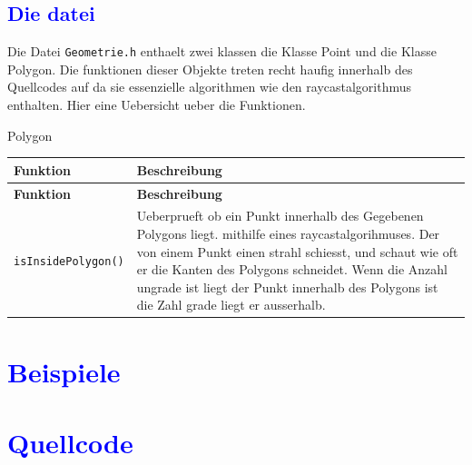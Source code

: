 \documentclass{article}
\begin{document}
\subsection{\textcolor{blue}{Die datei }}
Die Datei \texttt{Geometrie.h} enthaelt zwei klassen die Klasse Point und die Klasse Polygon. Die funktionen dieser Objekte treten recht haufig innerhalb des Quellcodes auf da sie essenzielle algorithmen wie den raycastalgorithmus enthalten. Hier eine Uebersicht ueber die Funktionen.
\par\medskip
\begin{center}\Large{ Polygon}\end{center}
\begin{longtable}{|>{\raggedright\arraybackslash}p{3.5cm}|p{11.5cm}|}
\hline
\textbf{Funktion} & \textbf{Beschreibung} \\
\hline
\endfirsthead
\hline
\textbf{Funktion} & \textbf{Beschreibung} \\
\hline
\endhead
\texttt{isInsidePolygon()} &
Ueberprueft ob ein Punkt innerhalb des Gegebenen Polygons liegt. mithilfe eines raycastalgorihmuses. Der von einem Punkt einen strahl schiesst, und schaut wie oft er die Kanten des Polygons schneidet. Wenn die Anzahl ungrade ist liegt der Punkt innerhalb des Polygons ist die Zahl grade liegt er ausserhalb. \\
\hline
\end{longtable}

\section{\textcolor{blue}{Beispiele}}
\section{\textcolor{blue}{Quellcode}}
\end{document}

